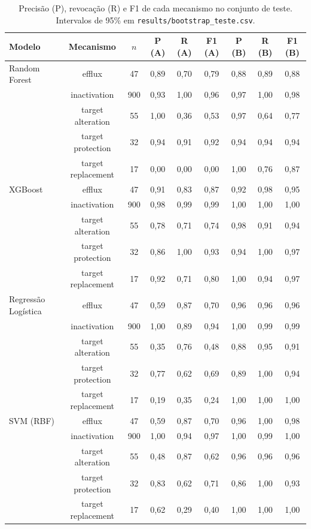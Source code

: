 \begin{table}[htbp]
  \centering
  \caption{Precisão (P), revocação (R) e F1 de cada mecanismo no conjunto de teste. Intervalos de 95\% em \texttt{results/bootstrap\_teste.csv}.}
  \label{tab:por_classe}
  \begin{tabular}{lcccccccc}
    \toprule
    Modelo & Mecanismo & $n$ & P (A) & R (A) & F1 (A) & P (B) & R (B) & F1 (B) \\
    \midrule
    Random Forest & efflux & 47 & 0,89 & 0,70 & 0,79 & 0,88 & 0,89 & 0,88 \\
     & inactivation & 900 & 0,93 & 1,00 & 0,96 & 0,97 & 1,00 & 0,98 \\
     & target alteration & 55 & 1,00 & 0,36 & 0,53 & 0,97 & 0,64 & 0,77 \\
     & target protection & 32 & 0,94 & 0,91 & 0,92 & 0,94 & 0,94 & 0,94 \\
     & target replacement & 17 & 0,00 & 0,00 & 0,00 & 1,00 & 0,76 & 0,87 \\
    XGBoost & efflux & 47 & 0,91 & 0,83 & 0,87 & 0,92 & 0,98 & 0,95 \\
     & inactivation & 900 & 0,98 & 0,99 & 0,99 & 1,00 & 1,00 & 1,00 \\
     & target alteration & 55 & 0,78 & 0,71 & 0,74 & 0,98 & 0,91 & 0,94 \\
     & target protection & 32 & 0,86 & 1,00 & 0,93 & 0,94 & 1,00 & 0,97 \\
     & target replacement & 17 & 0,92 & 0,71 & 0,80 & 1,00 & 0,94 & 0,97 \\
    Regressão Logística & efflux & 47 & 0,59 & 0,87 & 0,70 & 0,96 & 0,96 & 0,96 \\
     & inactivation & 900 & 1,00 & 0,89 & 0,94 & 1,00 & 0,99 & 0,99 \\
     & target alteration & 55 & 0,35 & 0,76 & 0,48 & 0,88 & 0,95 & 0,91 \\
     & target protection & 32 & 0,77 & 0,62 & 0,69 & 0,89 & 1,00 & 0,94 \\
     & target replacement & 17 & 0,19 & 0,35 & 0,24 & 1,00 & 1,00 & 1,00 \\
    SVM (RBF) & efflux & 47 & 0,59 & 0,87 & 0,70 & 0,96 & 1,00 & 0,98 \\
     & inactivation & 900 & 1,00 & 0,94 & 0,97 & 1,00 & 0,99 & 1,00 \\
     & target alteration & 55 & 0,48 & 0,87 & 0,62 & 0,96 & 0,96 & 0,96 \\
     & target protection & 32 & 0,83 & 0,62 & 0,71 & 0,86 & 1,00 & 0,93 \\
     & target replacement & 17 & 0,62 & 0,29 & 0,40 & 1,00 & 1,00 & 1,00 \\
    \bottomrule
  \end{tabular}
\end{table}
